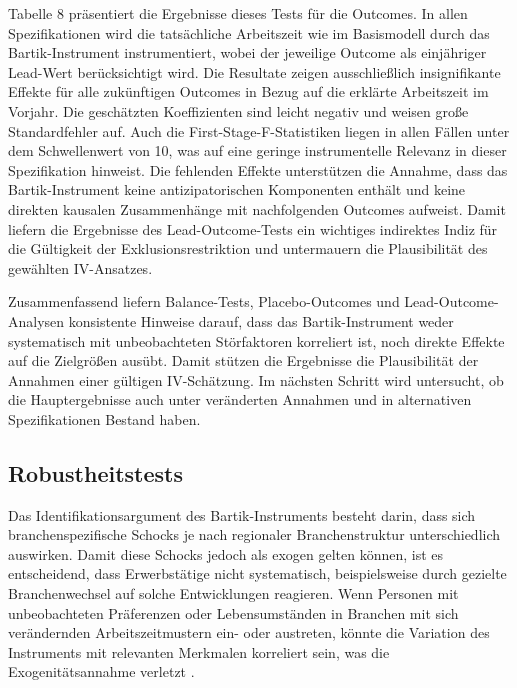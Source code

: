 \documentclass[12pt,a4paper]{article}
\begin{document}
Tabelle 8 präsentiert die Ergebnisse dieses Tests für die Outcomes. In allen Spezifikationen wird die tatsächliche Arbeitszeit wie im Basismodell durch das Bartik-Instrument instrumentiert, wobei der jeweilige Outcome als einjähriger Lead-Wert berücksichtigt wird. 
Die Resultate zeigen ausschließlich insignifikante Effekte für alle zukünftigen Outcomes in Bezug auf die erklärte Arbeitszeit im Vorjahr. Die geschätzten Koeffizienten sind leicht negativ und weisen große Standardfehler auf. Auch die First-Stage-F-Statistiken liegen in allen Fällen unter dem Schwellenwert von 10, was auf eine geringe instrumentelle Relevanz in dieser Spezifikation hinweist. Die fehlenden Effekte unterstützen die Annahme, dass das Bartik-Instrument keine antizipatorischen Komponenten enthält und keine direkten kausalen Zusammenhänge mit nachfolgenden Outcomes aufweist. Damit liefern die Ergebnisse des Lead-Outcome-Tests ein wichtiges indirektes Indiz für die Gültigkeit der Exklusionsrestriktion und untermauern die Plausibilität des gewählten IV-Ansatzes. 

Zusammenfassend liefern Balance-Tests, Placebo-Outcomes und Lead-Outcome-Analysen konsistente Hinweise darauf, dass das Bartik-Instrument weder systematisch mit unbeobachteten Störfaktoren korreliert ist, noch direkte Effekte auf die Zielgrößen ausübt. Damit stützen die Ergebnisse die Plausibilität der Annahmen einer gültigen IV-Schätzung. Im nächsten Schritt wird untersucht, ob die Hauptergebnisse auch unter veränderten Annahmen und in alternativen Spezifikationen Bestand haben.

\subsection{Robustheitstests}
Das Identifikationsargument des Bartik-Instruments besteht darin, dass sich branchenspezifische Schocks je nach regionaler Branchenstruktur unterschiedlich auswirken. Damit diese Schocks jedoch als exogen gelten können, ist es entscheidend, dass Erwerbstätige nicht systematisch, beispielsweise durch gezielte Branchenwechsel auf solche Entwicklungen reagieren. Wenn Personen mit unbeobachteten Präferenzen oder Lebensumständen in Branchen mit sich verändernden Arbeitszeitmustern ein- oder austreten, könnte die Variation des Instruments mit relevanten Merkmalen korreliert sein, was die Exogenitätsannahme verletzt \parencite{goldsmith2020,borusyak2025}. 
\end{document}
